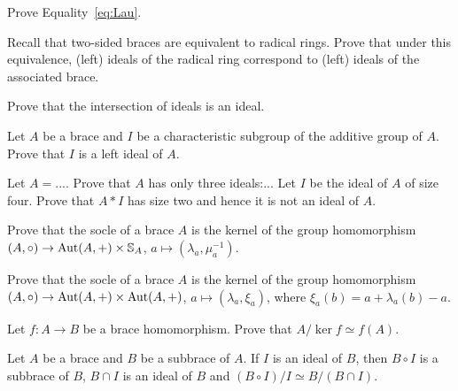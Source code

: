 \begin{prob}
\label{prob:Lau}
    Prove Equality~\eqref{eq:Lau}.
\end{prob}


\begin{prob}
\label{prob:radical}
Recall that two-sided braces are equivalent to radical rings. Prove that under this equivalence, 
(left) ideals of the radical ring correspond to (left) ideals of the associated brace. 
\end{prob}

\begin{prob}
\label{prob:sum_ideals}
Prove that the intersection of ideals is an ideal. 
\end{prob}

\begin{prob}
Let $A$ be a brace and $I$ be a characteristic subgroup of the additive group of $A$. Prove that
$I$ is a left ideal of $A$. 
\end{prob}

\begin{prob}
Let $A=...$. Prove that $A$ has only three ideals:... Let $I$ be the ideal of $A$ of size four. Prove that
$A*I$ has size two and hence it is not an ideal of $A$. 
\end{prob}

\begin{prob}
\label{prob:Bachiller1}
Prove that the socle of a brace $A$ is the kernel of the 
group homomorphism $(A,\circ)\to\operatorname{Aut}(A,+)\times\mathbb{S}_A$, $a\mapsto (\lambda_a,\mu_a^{-1})$. 
\end{prob}

\begin{prob}
\label{prob:Bachiller2}
Prove that the socle of a brace $A$ is the kernel of the 
group homomorphism $(A,\circ)\to\operatorname{Aut}(A,+)\times\operatorname{Aut}(A,+)$, $a\mapsto (\lambda_a,\xi_a)$, where
$\xi_a(b)=a+\lambda_a(b)-a$. 
\end{prob}

\begin{prob}
\label{prob:iso1}
    Let $f\colon A\to B$ be a brace homomorphism. Prove that $A/\ker f\simeq f(A)$. 
\end{prob}

\begin{prob}
\label{prob:iso2}
    Let $A$ be a brace and $B$ be a subbrace of $A$. If $I$ is an ideal of $B$, 
    then $B\circ I$ is a subbrace of $B$, 
    $B\cap I$ is an ideal of $B$ and $(B\circ I)/I\simeq B/(B\cap I)$. 
\end{prob}

